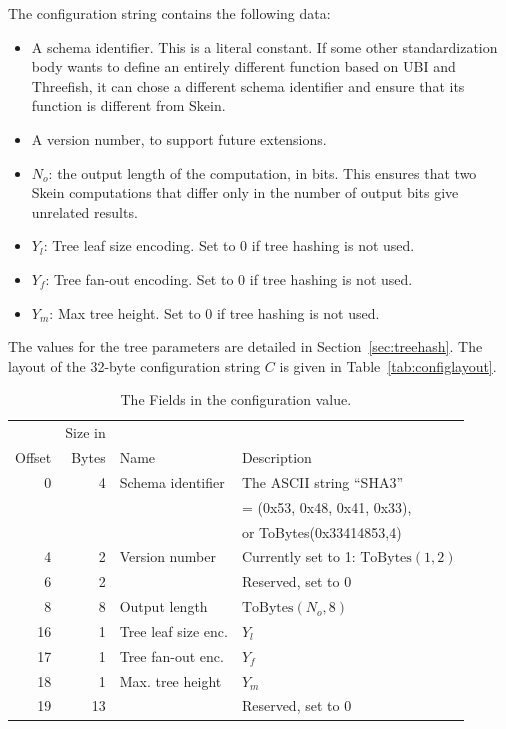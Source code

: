 \documentclass[11pt,twoside]{article}
\def\symdef#1{\label{symdef:#1}}
\newcommand{\ToBytes}{\text{ToBytes}\xspace}
\begin{document}
The configuration string contains the following data:
\begin{itemize}
  \item A schema identifier. This is a literal constant. If some other standardization body wants to define an entirely different function based on UBI and Threefish, it can chose a different schema identifier and ensure that its function is different from Skein.
  \item A version number, to support future extensions.
  \item $N_o$: the output length of the computation, in bits. This ensures that two Skein computations that differ only in the number of output bits give unrelated results.\symdef{N_o}
  \item $Y_l$: Tree leaf size encoding. Set to 0 if tree hashing is not used.
  \item $Y_f$: Tree fan-out encoding. Set to 0 if tree hashing is not used.
  \item $Y_m$: Max tree height. Set to 0 if tree hashing is not used.
\end{itemize}
The values for the tree parameters are detailed in Section~\ref{sec:treehash}. The layout of the 32-byte configuration string $C$ is given in Table~\ref{tab:configlayout}.
%
\begin{table}[tbh]
\begin{center}
\begin{tabular}{|rrlp{250pt}|}
  \hline
  & Size in & &\\
  Offset & Bytes & Name & Description \\
  \hline
   0 & 4 & Schema identifier & The ASCII string ``SHA3'' \\
     &   &    & = (0x53, 0x48, 0x41, 0x33), \\
     &   &    & or ToBytes(0x33414853,4) \\
   4 & 2 & Version number & Currently set to 1: $\ToBytes( 1, 2 )$\\
   6 & 2 & & Reserved, set to 0\\
   8 & 8 & Output length & $\ToBytes( N_o, 8 )$ \\
  16 & 1 & Tree leaf size enc.& $Y_l$\\
  17 & 1 & Tree fan-out enc.& $Y_f$ \\
  18 & 1 & Max. tree height & $Y_m$ \\
  19 & 13 & & Reserved, set to 0\\
  \hline
\end{tabular}
\caption{The Fields in the configuration value.}\label{tab:configlayout}\symdef{Conf}
\end{center}
\end{table}
\end{document}
